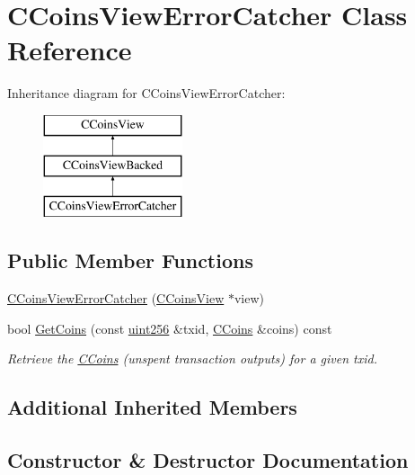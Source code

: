 \hypertarget{class_c_coins_view_error_catcher}{}\section{C\+Coins\+View\+Error\+Catcher Class Reference}
\label{class_c_coins_view_error_catcher}
Inheritance diagram for C\+Coins\+View\+Error\+Catcher\+:\begin{figure}[H]
\begin{center}
\leavevmode
\includegraphics[height=3.000000cm]{class_c_coins_view_error_catcher}
\end{center}
\end{figure}
\subsection*{Public Member Functions}
\begin{DoxyCompactItemize}
\item 
\mbox{\hyperlink{class_c_coins_view_error_catcher_aa8295e2f5ce5ad9880c5bd86d52e014c}{C\+Coins\+View\+Error\+Catcher}} (\mbox{\hyperlink{class_c_coins_view}{C\+Coins\+View}} $\ast$view)
\item 
bool \mbox{\hyperlink{class_c_coins_view_error_catcher_a909f7b9e364b6f06bfea955209aa015d}{Get\+Coins}} (const \mbox{\hyperlink{classuint256}{uint256}} \&txid, \mbox{\hyperlink{class_c_coins}{C\+Coins}} \&coins) const
\begin{DoxyCompactList}\small\item\em Retrieve the \mbox{\hyperlink{class_c_coins}{C\+Coins}} (unspent transaction outputs) for a given txid. \end{DoxyCompactList}\end{DoxyCompactItemize}
\subsection*{Additional Inherited Members}


\subsection{Constructor \& Destructor Documentation}
\mbox{\label{class_c_coins_view_error_catcher_aa8295e2f5ce5ad9880c5bd86d52e014c}} 
